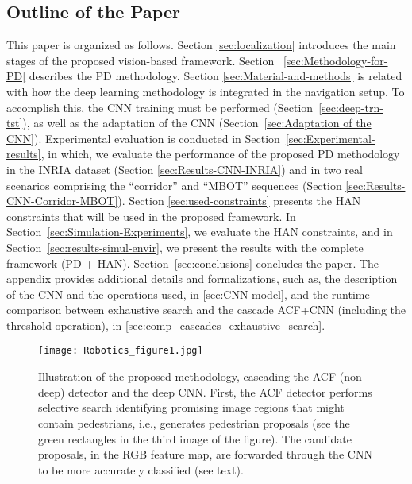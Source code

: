 \documentclass[5p,time]{elsarticle}
\begin{document}
\subsection{Outline of the Paper}

This paper is organized as follows. Section \ref{sec:localization} introduces the main stages of the proposed vision-based framework. Section ~\ref{sec:Methodology-for-PD} describes the PD methodology. Section \ref{sec:Material-and-methods} is related with how the deep learning methodology is integrated in the navigation setup. To accomplish this, the CNN training must be performed (Section~\ref{sec:deep-trn-tst}), as well as the adaptation of the CNN (Section~\ref{sec:Adaptation of the CNN}). Experimental evaluation is conducted in Section~\ref{sec:Experimental-results}, in which, we evaluate the performance of the proposed PD methodology in the INRIA dataset (Section \ref{sec:Results-CNN-INRIA}) and in two real scenarios comprising the ``corridor'' and ``MBOT'' sequences (Section \ref{sec:Results-CNN-Corridor-MBOT}). Section \ref{sec:used-constraints} presents the HAN constraints that will be used in the proposed framework. In Section~\ref{sec:Simulation-Experiments}, we evaluate the HAN constraints, and in Section~\ref{sec:results-simul-envir}, we present the results with the complete framework (PD + HAN). Section~\ref{sec:conclusions} concludes the paper. The appendix provides additional details and formalizations, such as, the description of the CNN and the operations used, in \ref{sec:CNN-model}, and the runtime comparison between exhaustive search and the cascade ACF+CNN (including the threshold operation), in \ref{sec:comp_cascades_exhaustive_search}.

\begin{figure*}[t]
	\begin{center}
		\texttt{[image: Robotics\_figure1.jpg]}
	\end{center}
	\caption{Illustration of the proposed methodology, cascading the ACF (non-deep) detector and the deep CNN. First, the ACF detector performs selective search identifying promising image regions that might contain pedestrians, i.e., generates pedestrian proposals (see the green rectangles in the third image of the figure). The candidate proposals, in the RGB feature map, are forwarded through the CNN to be more accurately classified (see text).}\label{fig:PD-proposal}
\end{figure*}
\end{document}
